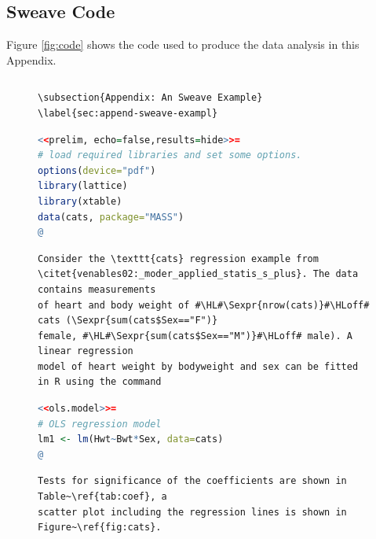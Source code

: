 \documentclass[11pt,article,oneside]{memoir}
\begin{document}
 
\subsection*{Sweave Code} %
\label{app:sweave_code}

\label{app:sweave-code}
Figure \ref{fig:code} shows the code used to produce the data analysis in this Appendix.

\begin{figure}
\begin{lstlisting}[style=sweave-top]

\end{lstlisting} 
\begin{lstlisting}[language={[latex]tex},numbers=none,style=sweave-tex]   
\subsection{Appendix: An Sweave Example}
\label{sec:append-sweave-exampl}
\end{lstlisting}
\begin{lstlisting}[language=R,numbers=none,style=sweave-r] 
<<prelim, echo=false,results=hide>>=
# load required libraries and set some options.
options(device="pdf")
library(lattice)
library(xtable)
data(cats, package="MASS")
@ 
\end{lstlisting}
\begin{lstlisting}[language={[latex]tex},numbers=none,style=sweave-tex] 
Consider the \texttt{cats} regression example from 
\citet{venables02:_moder_applied_statis_s_plus}. The data contains measurements 
of heart and body weight of #\HL#\Sexpr{nrow(cats)}#\HLoff# cats (\Sexpr{sum(cats$Sex=="F")}
female, #\HL#\Sexpr{sum(cats$Sex=="M")}#\HLoff# male). A linear regression
model of heart weight by bodyweight and sex can be fitted in R using the command
\end{lstlisting} 
\begin{lstlisting}[language=R,numbers=none,style=sweave-r] 
<<ols.model>>=
# OLS regression model 
lm1 <- lm(Hwt~Bwt*Sex, data=cats)
@ 
\end{lstlisting}
\begin{lstlisting}[language={[latex]tex},numbers=none,style=sweave-tex] 
Tests for significance of the coefficients are shown in Table~\ref{tab:coef}, a 
scatter plot including the regression lines is shown in Figure~\ref{fig:cats}.
\end{lstlisting}


\end{figure}
\end{document}
